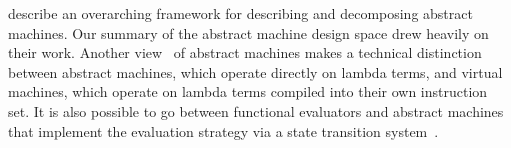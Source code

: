 describe an overarching framework for describing and decomposing abstract machines. Our summary of the abstract machine design space drew heavily on their work. Another view~\citep{Ager:From:2003} of abstract machines makes a technical distinction between abstract machines, which operate directly on lambda terms, and virtual machines, which operate on lambda terms compiled into their own instruction set. It is also possible to go between functional evaluators and abstract machines that implement the evaluation strategy via a state transition system~\citep{Ager:A-functional:2003}.